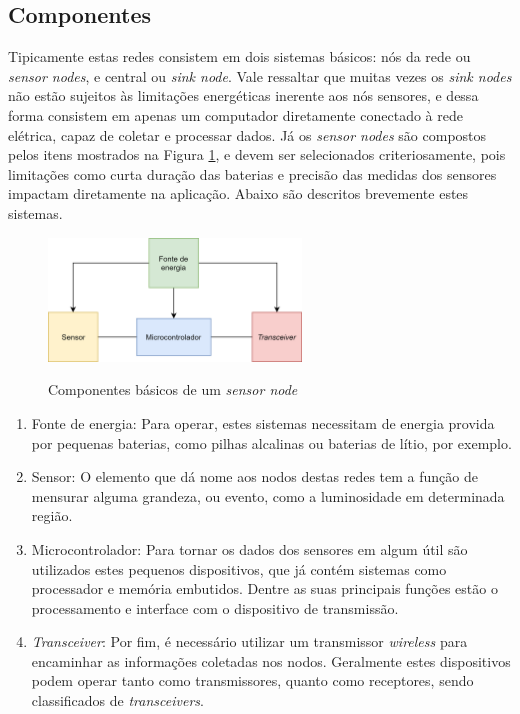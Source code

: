 \documentclass[oneside,openright,12pt]{ufsm_2015} %
\begin{document}
\subsection{Componentes}
Tipicamente estas redes consistem em dois sistemas básicos: nós da rede ou \textit{sensor nodes}, e central ou \textit{sink node}. 
Vale ressaltar que muitas vezes os \textit{sink nodes} não estão sujeitos às limitações energéticas inerente aos nós sensores, e dessa  forma consistem em apenas um computador diretamente conectado à rede elétrica, capaz de coletar e processar dados. Já os \textit{sensor nodes} são compostos pelos itens mostrados na Figura \ref{fig:sensor-node-components}, e devem ser selecionados criteriosamente, pois limitações como curta duração das baterias e precisão das medidas dos sensores impactam diretamente na aplicação. Abaixo são descritos brevemente estes sistemas.

\begin{figure}[ht]
 	    \caption{\label{exepretex} Componentes básicos de um \textit{sensor node}}
    \centering
    \includegraphics[width=0.6\textwidth]{figuras/wsn-blocks.png}
    \vspace{\baselineskip} %
        \label{fig:sensor-node-components}
\end{figure}

\begin{enumerate}
    \item Fonte de energia: Para operar, estes sistemas necessitam de energia provida por pequenas baterias, como pilhas alcalinas ou baterias de lítio, por exemplo.
    \item Sensor: O elemento que dá nome aos nodos destas redes tem a função de mensurar alguma grandeza, ou evento, como a luminosidade em determinada região.
    \item Microcontrolador: Para tornar os dados dos sensores em algum útil são utilizados estes pequenos dispositivos, que já contém sistemas como processador e memória embutidos. Dentre as suas principais funções estão o processamento e interface com o dispositivo de transmissão.
    \item \textit{Transceiver}: Por fim, é necessário utilizar um transmissor \textit{wireless} para encaminhar as informações coletadas nos nodos. Geralmente estes dispositivos podem operar tanto como transmissores, quanto como receptores, sendo classificados de \textit{transceivers}.
\end{enumerate}
\end{document}
